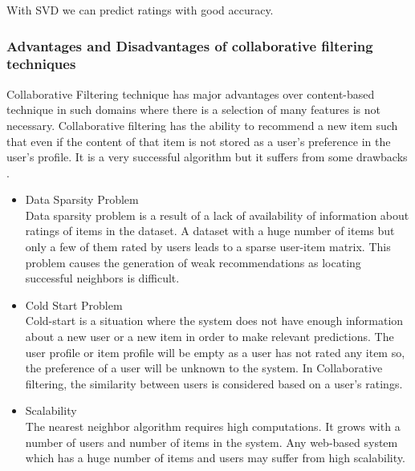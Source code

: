 \noindent With SVD we can predict ratings with good accuracy.

\subsubsection{Advantages and Disadvantages of collaborative filtering techniques}
\label{cf_pros_cons}
Collaborative Filtering technique has major advantages over content-based technique in such domains where there is a selection of many features is not necessary. Collaborative filtering has the ability to recommend a new item such that even if the content of that item is not stored as a user's preference in the user's profile. It is a very successful algorithm but it suffers from some drawbacks \cite{10}.
\begin{itemize}
\item Data Sparsity Problem \\
Data sparsity problem is a result of a lack of availability of information about ratings of items in the dataset. A dataset with a huge number of items but only a few of them rated by users leads to a sparse user-item matrix. This problem causes the generation of weak recommendations as locating successful neighbors is difficult.
\item Cold Start Problem \\
Cold-start is a situation where the system does not have enough information about a new user or a new item in order to make relevant predictions. The user profile or item profile will be empty as a user has not rated any item so, the preference of a user will be unknown to the system. In Collaborative filtering, the similarity between users is considered based on a user's ratings.
\item Scalability \\
The nearest neighbor algorithm requires high computations. It grows with a number of users and number of items in the system. Any web-based system which has a huge number of items and users may suffer from high scalability.

\end{itemize}

